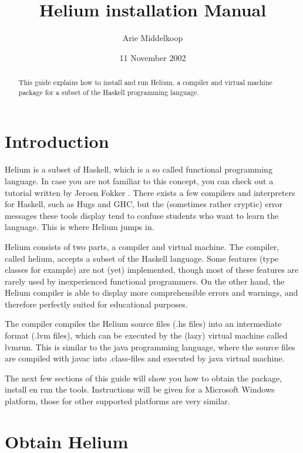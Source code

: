 \documentclass[pdftex,11pt,a4paper,notitlepage]{article}
\title{Helium installation Manual}
\author{Arie Middelkoop}
\date{11 November 2002}
\begin{document}
    \maketitle

    
    \begin{abstract}
        This guide explains how to install and run Helium, a compiler and
        virtual machine package for a subset of the Haskell programming
        language.
    \end{abstract}
    
    
    \section{Introduction}
    
        Helium is a subset of Haskell, which is a so called functional
        programming language. In case you are not familiar to this concept,
        you can check out a tutorial written by Jeroen Fokker \cite{JEROEN}.
        There exists a few compilers and interpreters for Haskell, such as
        Hugs and GHC\cite{HASKELL}, but the (sometimes rather cryptic) error
        messages these tools display tend to confuse students who want to
        learn the language. This is where Helium jumps in.
        
        Helium consists of two parts, a compiler and virtual machine. The
        compiler, called helium, accepts a subset of the Haskell language. Some
        features (type classes for example) are not (yet) implemented, though
        most of these features are rarely used by inexperienced functional
        programmers. On the other hand, the Helium compiler is able to display
        more comprehensible errors and warnings, and therefore perfectly
        suited for educational purposes.
        
        The compiler compiles the Helium source files (.hs files) into an
        intermediate format (.lvm files), which can be executed by the
        (lazy) virtual machine called lvmrun. This is similar to the java
        programming language, where the source files are compiled with javac
        into .class-files and executed by java virtual machine.
        
        The next few sections of this guide will show you how to obtain the
        package, install en run the tools. Instructions will be given for a
        Microsoft Windows platform, those for other supported platforms are
        very similar.


    \section{Obtain Helium}
    
\end{document}
